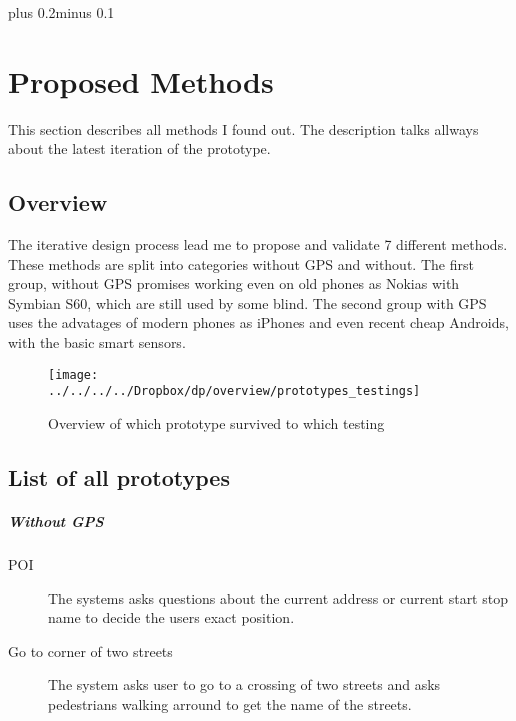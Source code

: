 \documentclass[11pt,oneside,a4paper]{book}
\begin{document}
	\mainbodystarts
	\normalfont
	\baselineskip plus 0.2\baselineskip minus 0.1\baselineskip
	
	
	
	
	
	
	\chapter{Proposed Methods}
	This section describes all methods I found out. The description talks allways about the latest iteration of the prototype.
		\section{Overview}
			The iterative design process lead me to propose and validate 7 different methods. These methods are split into categories without GPS and without. The first group, without GPS promises working even on old phones as Nokias with Symbian S60, which are still used by some blind. The second group with GPS uses the advatages of modern phones as iPhones and even recent cheap Androids, with the basic smart sensors.
			
			\begin{figure}[ht]
				\centering
				\texttt{[image: ../../../../Dropbox/dp/overview/prototypes\_testings]}
				\caption{Overview of which prototype survived to which testing}
				\label{fig:prototypestestings}
			\end{figure}
			
		\section{List of all prototypes}
			\paragraph{Without GPS}
				\begin{description}
					\item [POI]
						The systems asks questions about the current address or current start stop name to decide the users exact position.
					\item [Go to corner of two streets]
						The system asks user to go to a crossing of two streets and asks pedestrians walking arround to get the name of the streets. 
				\end{description}
\end{document}
